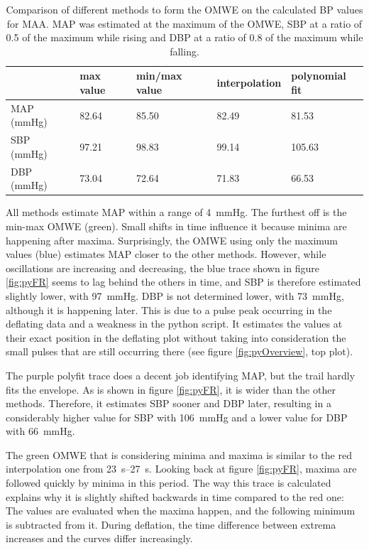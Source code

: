 \begin{table}[ht!]\label{tbl:maacomp}
\centering
\begin{tabular}{lllll}
\hline
           & max value & min/max value & interpolation & polynomial fit \\ \hline
MAP (mmHg) & 82.64     & 85.50         & 82.49         & 81.53          \\ 
SBP (mmHg) & 97.21     & 98.83         & 99.14         & 105.63         \\ 
DBP (mmHg) & 73.04     & 72.64         & 71.83         & 66.53          \\ \hline
\end{tabular}
\caption[Comparison of different methods to form the OMWE on the calculated BP values for the MAA.]{Comparison of different methods to form the OMWE on the calculated BP values for MAA. MAP was estimated at the maximum of the OMWE, SBP at a ratio of 0.5 of the maximum while rising and DBP at a ratio of 0.8 of the maximum while falling.}
\end{table}

All methods estimate MAP within a range of \SI{4}{\mmHg}. The furthest off is the min-max OMWE (green). Small shifts in time influence it because minima are happening after maxima. Surprisingly, the OMWE using only the maximum values (blue) estimates MAP closer to the other methods. However, while oscillations are increasing and decreasing, the blue trace shown in figure \ref{fig:pyFR} seems to lag behind the others in time, and SBP is therefore estimated slightly lower, with \SI{97}{\mmHg}. DBP is not determined lower, with \SI{73}{\mmHg}, although it is happening later. This is due to a pulse peak occurring in the deflating data and a weakness in the python script. It estimates the values at their exact position in the deflating plot without taking into consideration the small pulses that are still occurring there (see figure \ref{fig:pyOverview}, top plot).

The purple polyfit trace does a decent job identifying MAP, but the trail hardly fits the envelope. As is shown in figure \ref{fig:pyFR}, it is wider than the other methods. Therefore, it estimates SBP sooner and DBP later, resulting in a considerably higher value for SBP with \SI{106}{\mmHg} and a lower value for DBP with \SI{66}{\mmHg}. 

The green OMWE that is considering minima and maxima is similar to the red interpolation one from \SIrange{23}{27}{\s}. Looking back at figure \ref{fig:pyFR}, maxima are followed quickly by minima in this period. The way this trace is calculated explains why it is slightly shifted backwards in time compared to the red one: The values are evaluated when the maxima happen, and the following minimum is subtracted from it. During deflation, the time difference between extrema increases and the curves differ increasingly.

